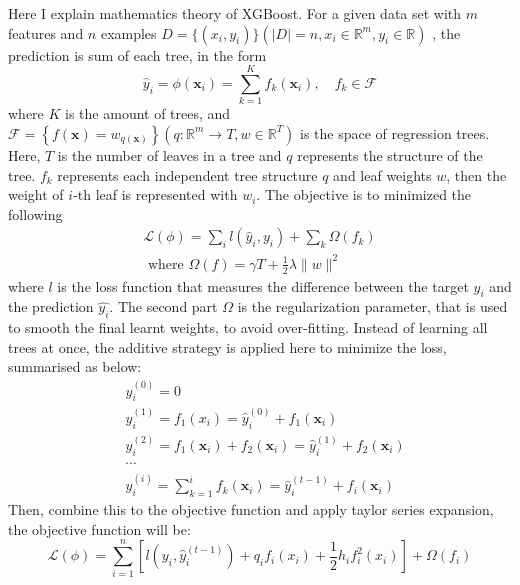 \documentclass[12pt,a4paper,english
]{tunithesis}
\begin{document}
Here I explain mathematics theory of XGBoost. For a given data set with $m$ features and $n$ examples $D = \{(x_i, y_i)\}(|D|=n, x_i \in \mathbb{R}^m, y_i \in \mathbb{R})$ , the prediction is sum of each tree, in the form
\begin{equation}
    \hat{y}_i=\phi\left(\mathbf{x}_i\right)=\sum_{k=1}^K f_k\left(\mathbf{x}_i\right), \quad f_k \in \mathcal{F}
\end{equation}
where $K$ is the amount of trees, and $\mathcal{F}=\left\{f(\mathbf{x})=w_{q(\mathbf{x})}\right\}\left(q: \mathbb{R}^m \rightarrow T, w \in \mathbb{R}^T\right)$ is the space of regression trees. Here, $T$ is the number of leaves in a tree and $q$ represents the structure of the tree. $f_k$ represents each independent tree structure $q$ and leaf weights $w$, then the weight of $i$-th leaf is represented with $w_i$. The objective is to minimized the following
\begin{equation}
    \begin{gathered}
\mathcal{L}(\phi)=\sum_i l\left(\hat{y}_i, y_i\right)+\sum_k \Omega\left(f_k\right) \\
\text { where } \Omega(f)=\gamma T+\frac{1}{2} \lambda\|w\|^2
\end{gathered}
\end{equation}
where $l$ is the loss function that measures the difference between the target $y_i$ and the prediction $\hat{y_i}$. The second part $\Omega$ is the regularization parameter, that is used to smooth the final learnt weights, to avoid over-fitting. Instead of learning all trees at once, the additive strategy is applied here to minimize the loss, summarised as below:
\begin{equation}
    \begin{aligned}
& \hat{y}_i^{(0)}=0 \\
& \hat{y}_i^{(1)}=f_1\left(x_i\right)=\hat{y}_i^{(0)}+f_1\left(\mathbf{x}_i\right) \\
& \hat{y}_i^{(2)}=f_1\left(\mathbf{x}_i\right)+f_2\left(\mathbf{x}_i\right)=\hat{y}_i^{(1)}+f_2\left(\mathbf{x}_i\right) \\
& \cdots \\
& \hat{y}_i^{(i)}=\sum_{k=1}^i f_k\left(\mathbf{x}_i\right)=\hat{y}_i^{(t-1)}+f_i\left(\mathbf{x}_i\right)
\end{aligned}
\end{equation}
Then, combine this to the objective function and apply taylor series expansion, the objective function will be:
\begin{equation}
    \mathcal{L}(\phi)=\sum_{i=1}^n\left[l\left(y_i, \hat{y}_i^{(t-1)}\right)+q_i f_i\left(x_i\right)+\frac{1}{2} h_i f_i^2\left(x_i\right)\right]+\Omega\left(f_i\right)
\end{equation}
\end{document}
